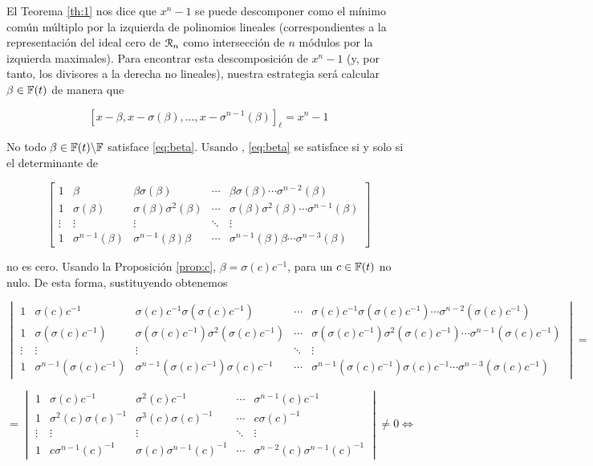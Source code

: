 \begin{ejemplo}
El Teorema \ref{th:1} nos dice que $x^n -1$ se puede descomponer como el mínimo común múltiplo por la izquierda de polinomios lineales (correspondientes a la representación del ideal cero de $\mathcal R_n$ como intersección de $n$ módulos por la izquierda maximales). Para encontrar esta descomposición de $x^n -1$ (y, por tanto, los divisores a la derecha no lineales), nuestra estrategia será calcular $\beta \in \mathbb{F}(t)$ de manera que 

\begin{equation}\label{eq:beta}
[x - \beta,x - \sigma(\beta),\dots,x - \sigma^{n-1}(\beta)]_\ell = x^n - 1
\end{equation}

No todo $\beta \in \mathbb{F}(t) \backslash \mathbb{F}$ satisface \eqref{eq:beta}. Usando \cite[Proposición 1]{boucher2007}, \eqref{eq:beta} se satisface si y solo si el determinante de

\[
\begin{bmatrix}
1 & \beta & \beta\sigma(\beta) & \cdots & \beta\sigma(\beta)\cdots\sigma^{n-2}(\beta) \\
1 & \sigma(\beta) & \sigma(\beta)\sigma^2(\beta) & \cdots & \sigma(\beta)\sigma^{2}(\beta)\cdots\sigma^{n-1}(\beta) \\
\vdots & \vdots & \vdots & \ddots & \vdots \\
1 & \sigma^{n-1}(\beta) & \sigma^{n-1}(\beta)\beta & \cdots & \sigma^{n-1}(\beta)\beta\cdots\sigma^{n-3}(\beta)
\end{bmatrix}
\]

no es cero. Usando la Proposición \ref{prop:c}, $\beta = \sigma(c)c^{-1}$, para un $c \in \mathbb{F}(t)$ no nulo. De esta forma, sustituyendo obtenemos 

\[
\begin{vmatrix}
1 & \sigma(c)c^{-1} & \sigma(c)c^{-1}\sigma(\sigma(c)c^{-1}) & \cdots & \sigma(c)c^{-1}\sigma(\sigma(c)c^{-1})\cdots\sigma^{n-2}(\sigma(c)c^{-1}) \\
1 & \sigma(\sigma(c)c^{-1}) & \sigma(\sigma(c)c^{-1})\sigma^2(\sigma(c)c^{-1}) & \cdots & \sigma(\sigma(c)c^{-1})\sigma^{2}(\sigma(c)c^{-1})\cdots\sigma^{n-1}(\sigma(c)c^{-1}) \\
\vdots & \vdots & \vdots & \ddots & \vdots \\
1 & \sigma^{n-1}(\sigma(c)c^{-1}) & \sigma^{n-1}(\sigma(c)c^{-1})\sigma(c)c^{-1} & \cdots & \sigma^{n-1}(\sigma(c)c^{-1})\sigma(c)c^{-1}\cdots\sigma^{n-3}(\sigma(c)c^{-1})
\end{vmatrix}
= \] 

\[ = 
\begin{vmatrix}
1 & \sigma(c)c^{-1} & \sigma^2(c)c^{-1} & \cdots & \sigma^{n-1}(c)c^{-1} \\
1 & \sigma^2(c)\sigma(c)^{-1} & \sigma^3(c)\sigma(c)^{-1} & \cdots & c\sigma(c)^{-1}\\
\vdots & \vdots & \vdots & \ddots & \vdots \\
1 & c\sigma^{n-1}(c)^{-1} & \sigma(c)\sigma^{n-1}(c)^{-1} & \cdots & \sigma^{n-2}(c)\sigma^{n-1}(c)^{-1}
\end{vmatrix}
\neq 0  \Leftrightarrow\] 


\end{ejemplo}
